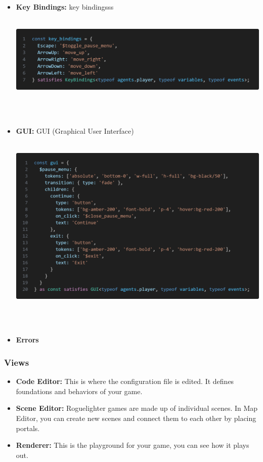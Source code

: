 \documentclass{article}
\begin{document}
\begin{itemize}
    \item \textbf{Key Bindings:} key bindingsss \\\\
    \begin{minipage}{\linewidth}
        \centering
        \includegraphics[width=1\textwidth]{key bindings.png}
    \end{minipage}\\\\
    
    \item \textbf{GUI:} GUI (Graphical User Interface)  \\\\
    \begin{minipage}{\linewidth}
        \centering
        \includegraphics[width=1\textwidth]{gui.png}
    \end{minipage}\\\\
    
    \item \textbf{Errors}
\end{itemize}
\subsubsection{Views}
\begin{itemize}
    \item \textbf{Code Editor:} This is where the configuration file is edited. It defines foundations and behaviors of your game. 
    \item \textbf{Scene Editor:} Roguelighter games are made up of individual scenes. In Map Editor, you can create new scenes and connect them to each other by placing portals.
    \item \textbf{Renderer:} This is the playground for your game, you can see how it plays out.  
\end{itemize}
\end{document}
